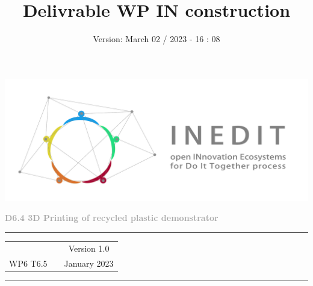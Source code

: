\documentclass[
  11pt,
]{article}
\title{Delivrable WP IN construction}
\subtitle{Version: March 02 / 2023 - 16 : 08}
\author{}
\date{}
\begin{document}
\maketitle

\begin{titlepage}
	\begin{center}

		\vspace{30mm}
		
		\includegraphics[width=\linewidth]{figures/Inedit_horiz.pdf}\\ 
		
		\vfill
		
		\textbf{\Huge{\textcolor{darkgray}{ D6.4 3D Printing of recycled plastic demonstrator }}} \\ 
		
		\vfill
		
		\vspace{60mm} 
		
		
		
      \textcolor{gray}{\rule{\textwidth}{2pt}}
      
		\vspace{5pt}
		\begin{tabular}{ c p{8cm} c }
           & & Version 1.0  \\ 
         WP6 T6.5  & & January 2023   \\ 
      \end{tabular}
		\vspace{5pt} 
		
		\textcolor{gray}{\rule{\textwidth}{2pt}}
		
		
	
		
		\vfill
		
	\end{center}
\end{titlepage}

\newpage
\end{document}
